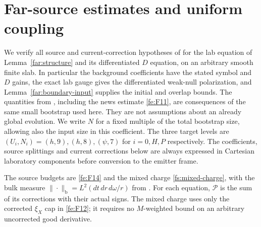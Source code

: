 \section{Far-source estimates and uniform coupling}
\label{fs:section}

We verify all source and current-correction hypotheses of
 for the lab equation of
Lemma~\ref{far:structure} and its differentiated $D$ equation, on an
arbitrary smooth finite slab.  In particular the background coefficients
have the stated symbol and $D$ gains, the exact lab gauge gives the
differentiated weak-null polarization, and
Lemma~\ref{far:boundary-input} supplies the initial and overlap bounds.
The quantities from , including the news estimate
\eqref{fe:F11}, are consequences of the same small bootstrap used here.
They are not assumptions about an already global evolution.
We write $N$ for a fixed multiple of the total bootstrap size, allowing
also the input size in this coefficient.  The three target levels are
$(U_i,N_i)=(h,9),(h,8),(\psi,7)$ for $i=0,H,P$ respectively.
The coefficients, source splittings and current corrections below are
always expressed in Cartesian laboratory components before conversion
to the emitter frame.

The source budgets are \eqref{fe:F14} and the mixed charge
\eqref{fs:mixed-charge}, with the bulk measure
$\|\cdot\|_{\mathrm b}=L^2(dt\,dr\,d\omega/r)$ from
.  For each equation, $\mathcal P$ is the sum of its
corrections with their actual signs.  The mixed charge uses only the
corrected $\xi_X$ cap in \eqref{fe:F12}; it requires no $M$-weighted
bound on an arbitrary uncorrected good derivative.

